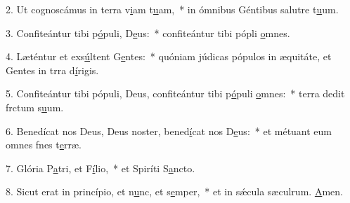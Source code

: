 2. Ut cognoscámus in terra v\uline{i}am t\uline{u}am,~* in ómnibus Géntibus salutre t\uline{u}um.\par 
3. Confiteántur tibi p\uline{ó}puli, D\uline{e}us:~* confiteántur tibi pópli \uline{o}mnes.\par 
4. Læténtur et exs\uline{ú}ltent G\uline{e}ntes:~* quóniam júdicas pópulos in æquitáte, et Gentes in trra d\uline{í}rigis.\par 
5. Confiteántur tibi pópuli, Deus, confiteántur tibi p\uline{ó}puli \uline{o}mnes:~* terra dedit frctum s\uline{u}um.\par 
6. Benedícat nos Deus, Deus noster, bened\uline{í}cat nos D\uline{e}us:~* et métuant eum omnes fnes t\uline{e}rræ.\par 
7. Glória P\uline{a}tri, et F\uline{í}lio,~* et Spiríti S\uline{a}ncto.\par 
8. Sicut erat in princípio, et n\uline{u}nc, et s\uline{e}mper,~* et in sǽcula sæculrum. \uline{A}men.\par 
